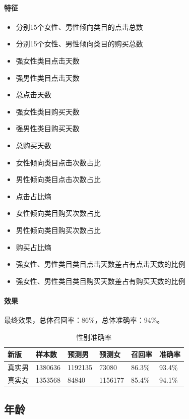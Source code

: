	\paragraph{特征}
	\begin{itemize}
	\item{分别15个女性、男性倾向类目的点击总数}
	\item{分别15个女性、男性倾向类目的购买总数}
	\item{强女性类目点击天数}
	\item{强男性类目点击天数}
	\item{总点击天数}
	\item{强女性类目购买天数}
	\item{强男性类目购买天数}
	\item{总购买天数}
	\item{女性倾向类目点击次数占比}
	\item{男性倾向类目点击次数占比}
	\item{点击占比熵}
	\item{女性倾向类目购买次数占比}
	\item{男性倾向类目购买次数占比}
	\item{购买占比熵}
	\item{强女性、男性类目类目点击天数差占有点击天数的比例}
	\item{强女性、男性类目类目购买天数差占有购买天数的比例}
	\end{itemize}

	\paragraph{效果}
	
	最终效果，总体召回率：86\%，总体准确率：94\%。
	
	\begin{table}
		\centering
		\caption{性别准确率}
		\begin{tabular}
			{|l|l|l|l|l|l|}
			\hline
			新版&样本数&预测男&预测女&召回率&准确率\\
			\hline
			真实男&1380636&1192135&73080&86.3\%&93.4\%\\
			\hline
			真实女&1353568&84840&1156177&85.4\%&94.1\%\\
			\hline
		\end{tabular}
		\label{性别准确率}
	\end{table}

	\subsection{年龄}
	
